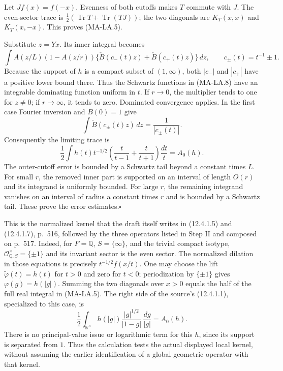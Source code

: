 Let $Jf(x)=f(-x)$.  Evenness of both cutoffs makes $T$ commute with
$J$.  The even-sector trace is
$\tfrac12(\operatorname{Tr}T+\operatorname{Tr}(TJ))$; the two
diagonals are $K_T(x,x)$ and $K_T(x,-x)$.  This proves (MA-LA.5).

Substitute $z=Yx$.  Its inner integral becomes
\[
 \int A(z/L)(1-A(z/r))
 \{\check B(c_-(t)z)+\check B(c_+(t)z)\}\,dz,
 \qquad c_\pm(t)=t^{-1}\pm1.
 \tag{MA-LA.8}
\]
Because the support of $h$ is a compact subset of $(1,\infty)$,
both $|c_-|$ and $|c_+|$ have a positive lower bound there.  Thus
the Schwartz functions in (MA-LA.8) have an integrable dominating
function uniform in $t$.  If $r\to0$, the multiplier tends to one
for $z\ne0$; if $r\to\infty$, it tends to zero.  Dominated
convergence applies.  In the first case Fourier inversion and
$B(0)=1$ give
\[
 \int\check B(c_\pm(t)z)\,dz=\frac1{|c_\pm(t)|}.
\]
Consequently the limiting trace is
\[
 \frac12\int h(t)t^{-1/2}
 \left(\frac{t}{t-1}+\frac{t}{t+1}\right)\frac{dt}{t}
 = A_0(h).
\]
The outer-cutoff error is bounded by a Schwartz tail beyond a
constant times $L$.  For small $r$, the removed inner part is
supported on an interval of length $O(r)$ and its integrand is
uniformly bounded.  For large $r$, the remaining integrand vanishes
on an interval of radius a constant times $r$ and is bounded by a
Schwartz tail.  These prove the error estimates.\hfill$\square$

This is the normalized kernel that the draft itself writes in
(12.4.1.5) and (12.4.1.7), p.~516, followed by the three operators
listed in Step II and composed on p.~517.  Indeed, for
$F=\mathbb Q$, $S=\{\infty\}$, and the trivial compact isotype,
$\mathcal O_{\mathbb Q,S}^\times=\{\pm1\}$ and its invariant
sector is the even sector.  The normalized dilation in those
equations is precisely $t^{-1/2}f(x/t)$.  One may choose the lift
$\widetilde\varphi(t)=h(t)$ for $t>0$ and zero for $t<0$;
periodization by $\{\pm1\}$ gives $\varphi(g)=h(|g|)$.
Summing the two diagonals over $x>0$ equals the half of the full
real integral in (MA-LA.5).  The right side of the source's
(12.4.1.1), specialized to this case, is
\[
 \frac12\int_{\mathbb R^\times}
 h(|g|)\frac{|g|^{1/2}}{|1-g|}\,\frac{dg}{|g|}=A_0(h).
 \tag{MA-LA.9}
\]
There is no principal-value issue or logarithmic term for this $h$,
since its support is separated from $1$.  Thus the calculation tests
the actual displayed local kernel, without assuming the earlier
identification of a global geometric operator with that kernel.


